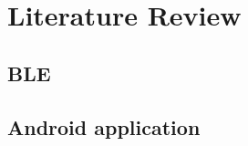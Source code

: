 \graphicspath{{introduction/fig/}}

\chapter{Literature Review}
\label{chap:litreview}

\section{BLE}
\label{sec:ble}

\section{Android application}
\label{sec:android}

\

